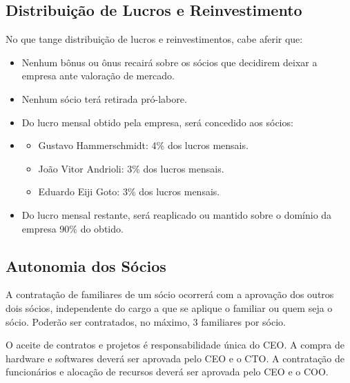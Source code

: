 \documentclass[onecolumn,12pt]{asme2ej}
\begin{document}

\subsection{Distribuição de Lucros e Reinvestimento}

No que tange distribuição de lucros e reinvestimentos, cabe aferir que:
        
\begin{itemize}
    \item[§] Nenhum bônus ou ônus recairá sobre os sócios que decidirem deixar a empresa ante valoração de mercado.
    \item[§] Nenhum sócio terá retirada pró-labore.
    \item[§] Do lucro mensal obtido pela empresa, será concedido aos sócios:
    \item \begin{itemize}
        \item[§§] Gustavo Hammerschmidt: 4\% dos lucros mensais.
        \item[§§] João Vitor Andrioli: 3\% dos lucros mensais.
        \item[§§] Eduardo Eiji Goto: 3\% dos lucros mensais.
    \end{itemize}
    \item[§] Do lucro mensal restante, será reaplicado ou mantido sobre o domínio da empresa 90\% do obtido.
\end{itemize}

\subsection{Autonomia dos Sócios}

A contratação de familiares de um sócio ocorrerá com a aprovação dos outros dois sócios, independente do cargo a que se aplique o familiar ou quem seja o sócio. Poderão ser contratados, no máximo, 3 familiares por sócio.

O aceite de contratos e projetos é responsabilidade única do CEO.
A compra de hardware e softwares deverá ser aprovada pelo CEO e o CTO.
A contratação de funcionários e alocação de recursos deverá ser aprovada pelo CEO e o COO.

\end{document}
